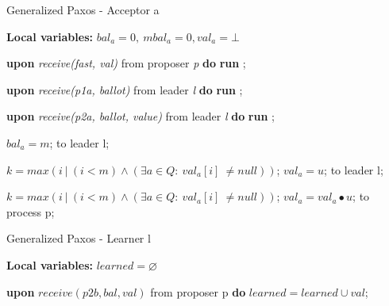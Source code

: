 \documentclass[10pt,pdftex,a4paper]{article}%
\def\val{\textit{val}}
\begin{document}
\begin{algorithm}
\caption{Generalized Paxos - Acceptor a}
\textbf{Local variables: } $bal_a = 0,\ mbal_a = 0, \val_a = \bot$ 
\begin{algorithmic}[1]
  
  \State \textbf{upon} \textit{receive(fast, val)} from proposer \textit{p} \textbf{do}
    \State \hspace{\algorithmicindent} \textbf{run} ;
    
    \State
    \State \textbf{upon} \textit{receive(p1a, ballot)} from leader \textit{l} \textbf{do}
    \State \hspace{\algorithmicindent} \textbf{run} ;
    
    \State
    \State \textbf{upon} \textit{receive(p2a, ballot, value)} from leader \textit{l} \textbf{do}
    \State \hspace{\algorithmicindent} \textbf{run} ;
    
    \State
            \State $bal_a = m$;
            \State {} to leader l;
        \EndIf
    \EndFunction
    
    \State
        \State $k = max(i\ |\ (i < m) \wedge (\exists a \in Q :\ val_a[i]\ \neq null))$;
            \State $val_a = u$;
            \State {} to leader l;
        \EndIf
    \EndFunction
    
    \State
        \State $k = max(i\ |\ (i < m) \wedge (\exists a \in Q :\ val_a[i]\ \neq null))$;
            \State $val_a = val_a \bullet u$;
            \State {} to process p;
        \EndIf
    \EndFunction
    
\end{algorithmic}
\end{algorithm}

\begin{algorithm}
\caption{Generalized Paxos - Learner l}
\textbf{Local variables: } $learned = \varnothing$ 
\begin{algorithmic}[1]
  
    \State \textbf{upon} $receive (p2b, bal, val)$ from proposer p \textbf{do}
        \State \hspace{\algorithmicindent} $learned = learned \cup val$;
\end{algorithmic}
\end{algorithm}

\setcounter{page}{1}


\end{document}
